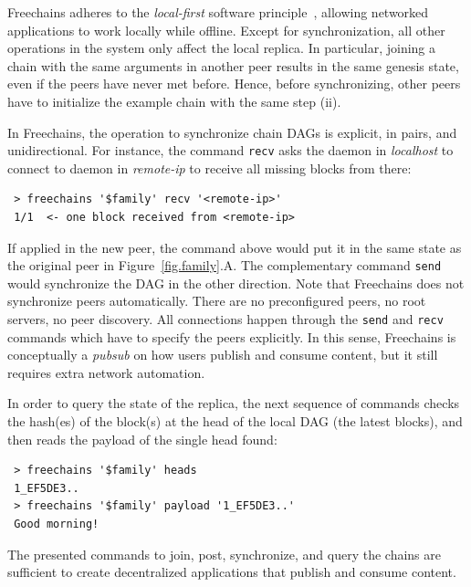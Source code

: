 \documentclass[10pt,journal,compsoc]{IEEEtran}
\newcommand{\FC}       {Freechains\xspace}
\newcommand{\code}[1]  {\texttt{\footnotesize{#1}}}
\begin{document}
\FC adheres to the \emph{local-first} software principle~\cite{p2p.local},
allowing networked applications to work locally while offline.
Except for synchronization, all other operations in the system only affect the
local replica.
In particular, joining a chain with the same arguments in another peer results
in the same genesis state, even if the peers have never met before.
Hence, before synchronizing, other peers have to initialize the example chain
with the same step (ii).

In \FC, the operation to synchronize chain DAGs is explicit, in pairs, and
unidirectional.
For instance, the command \code{recv} asks the daemon in \emph{localhost} to
connect to daemon in \emph{remote-ip} to receive all missing blocks from there:

{\footnotesize
\begin{verbatim}
 > freechains '$family' recv '<remote-ip>'
 1/1  <- one block received from <remote-ip>
\end{verbatim}
}

If applied in the new peer, the command above would put it in the same state as
the original peer in Figure~\ref{fig.family}.A.
The complementary command \code{send} would synchronize the DAG in the other
direction.
Note that \FC does not synchronize peers automatically.
There are no preconfigured peers, no root servers, no peer discovery.
All connections happen through the \code{send} and \code{recv} commands which
have to specify the peers explicitly.
In this sense, \FC is conceptually a \emph{pubsub} on how users publish and
consume content, but it still requires extra network automation.

In order to query the state of the replica, the next sequence of commands
checks the hash(es) of the block(s) at the head of the local DAG (the latest
blocks), and then reads the payload of the single head found:


{\footnotesize
\begin{verbatim}
 > freechains '$family' heads
 1_EF5DE3..
 > freechains '$family' payload '1_EF5DE3..'
 Good morning!
\end{verbatim}
}

The presented commands to join, post, synchronize, and query the chains are
sufficient to create decentralized applications that publish and consume
content.
\end{document}
